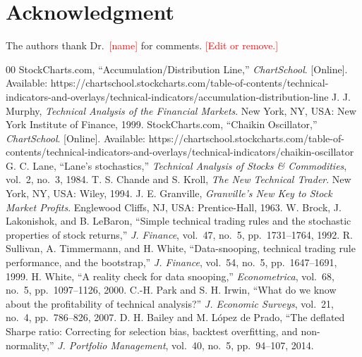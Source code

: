 \documentclass[conference]{IEEEtran}
\begin{document}
\section*{Acknowledgment}
The authors thank Dr.\ \textcolor{red}{[name]} for comments. \textcolor{red}{[Edit or remove.]}

\begin{thebibliography}{00}
 StockCharts.com, ``Accumulation/Distribution Line,'' \emph{ChartSchool}. [Online]. Available: https://chartschool.stockcharts.com/table-of-contents/technical-indicators-and-overlays/technical-indicators/accumulation-distribution-line
 J. J. Murphy, \emph{Technical Analysis of the Financial Markets}. New York, NY, USA: New York Institute of Finance, 1999.
 StockCharts.com, ``Chaikin Oscillator,'' \emph{ChartSchool}. [Online]. Available: https://chartschool.stockcharts.com/table-of-contents/technical-indicators-and-overlays/technical-indicators/chaikin-oscillator
 G. C. Lane, ``Lane's stochastics,'' \emph{Technical Analysis of Stocks \& Commodities}, vol.~2, no.~3, 1984.
 T. S. Chande and S. Kroll, \emph{The New Technical Trader}. New York, NY, USA: Wiley, 1994.
 J. E. Granville, \emph{Granville's New Key to Stock Market Profits}. Englewood Cliffs, NJ, USA: Prentice-Hall, 1963.
 W. Brock, J. Lakonishok, and B. LeBaron, ``Simple technical trading rules and the stochastic properties of stock returns,'' \emph{J. Finance}, vol.~47, no.~5, pp.~1731--1764, 1992.
 R. Sullivan, A. Timmermann, and H. White, ``Data-snooping, technical trading rule performance, and the bootstrap,'' \emph{J. Finance}, vol.~54, no.~5, pp.~1647--1691, 1999.
 H. White, ``A reality check for data snooping,'' \emph{Econometrica}, vol.~68, no.~5, pp.~1097--1126, 2000.
 C.-H. Park and S. H. Irwin, ``What do we know about the profitability of technical analysis?'' \emph{J. Economic Surveys}, vol.~21, no.~4, pp.~786--826, 2007.
 D. H. Bailey and M. L\'{o}pez de Prado, ``The deflated Sharpe ratio: Correcting for selection bias, backtest overfitting, and non-normality,'' \emph{J. Portfolio Management}, vol.~40, no.~5, pp.~94--107, 2014.
\end{thebibliography}
\end{document}
